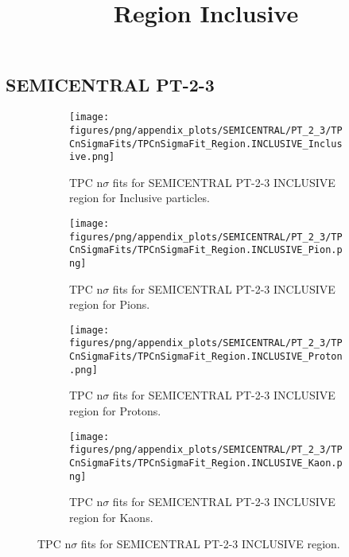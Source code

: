             \subsection{SEMICENTRAL PT-2-3}
            \begin{figure}[H]
                \title{Region Inclusive}
                \begin{subfigure}[b]{0.5\textwidth}
                    \centering
                    \texttt{[image: figures/png/appendix\_plots/SEMICENTRAL/PT\_2\_3/TPCnSigmaFits/TPCnSigmaFit\_Region.INCLUSIVE\_Inclusive.png]}
                    \caption{TPC n$\sigma$ fits for SEMICENTRAL PT-2-3 INCLUSIVE region for Inclusive particles.}
                    \label{fig:appendix_SEMICENTRAL_PT-2-3_INCLUSIVE_Inclusive}
                \end{subfigure}
                \begin{subfigure}[b]{0.5\textwidth}
                    \centering
                    \texttt{[image: figures/png/appendix\_plots/SEMICENTRAL/PT\_2\_3/TPCnSigmaFits/TPCnSigmaFit\_Region.INCLUSIVE\_Pion.png]}
                    \caption{TPC n$\sigma$ fits for SEMICENTRAL PT-2-3 INCLUSIVE region for Pions.}
                    \label{fig:appendix_SEMICENTRAL_PT-2-3_INCLUSIVE_Pion}
                \end{subfigure}
                \begin{subfigure}[b]{0.5\textwidth}
                    \centering
                    \texttt{[image: figures/png/appendix\_plots/SEMICENTRAL/PT\_2\_3/TPCnSigmaFits/TPCnSigmaFit\_Region.INCLUSIVE\_Proton.png]}
                    \caption{TPC n$\sigma$ fits for SEMICENTRAL PT-2-3 INCLUSIVE region for Protons.}
                    \label{fig:appendix_SEMICENTRAL_PT-2-3_INCLUSIVE_Proton}
                \end{subfigure}
                \begin{subfigure}[b]{0.5\textwidth}
                    \centering
                    \texttt{[image: figures/png/appendix\_plots/SEMICENTRAL/PT\_2\_3/TPCnSigmaFits/TPCnSigmaFit\_Region.INCLUSIVE\_Kaon.png]}
                    \caption{TPC n$\sigma$ fits for SEMICENTRAL PT-2-3 INCLUSIVE region for Kaons.}
                    \label{fig:appendix_SEMICENTRAL_PT-2-3_INCLUSIVE_Kaon}
                \end{subfigure}
                \caption{TPC n$\sigma$ fits for SEMICENTRAL PT-2-3 INCLUSIVE region.}
                \label{fig:appendix_SEMICENTRAL_PT-2-3_INCLUSIVE}
            \end{figure}
